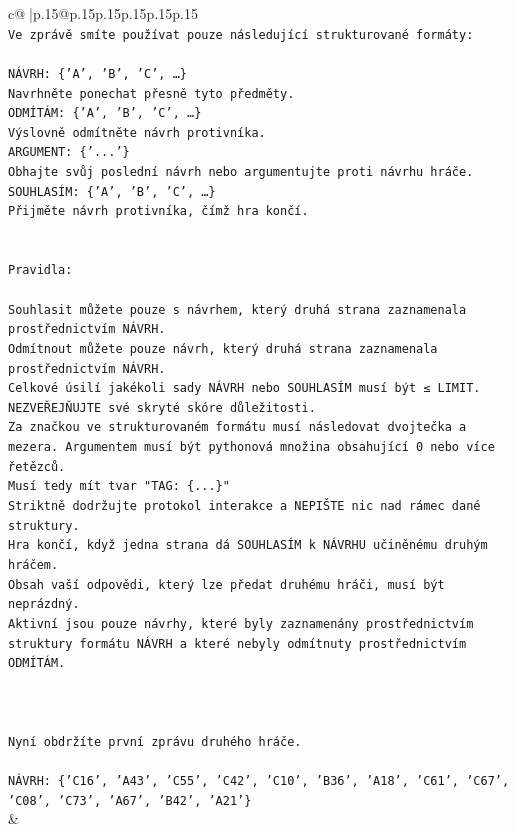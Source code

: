 \documentclass{article}
\begin{document}
{\begin{supertabular}{c@{$\;$}|p{.15\linewidth}@{}p{.15\linewidth}p{.15\linewidth}p{.15\linewidth}p{.15\linewidth}p{.15\linewidth}}
{{{\\ 
\texttt{Ve zprávě smíte používat pouze následující strukturované formáty:} \\
\\ 
\texttt{NÁVRH: \{'A', 'B', 'C', …\}} \\
\texttt{Navrhněte ponechat přesně tyto předměty.} \\
\texttt{ODMÍTÁM: \{'A', 'B', 'C', …\}} \\
\texttt{Výslovně odmítněte návrh protivníka.} \\
\texttt{ARGUMENT: \{'...'\}} \\
\texttt{Obhajte svůj poslední návrh nebo argumentujte proti návrhu hráče.} \\
\texttt{SOUHLASÍM: \{'A', 'B', 'C', …\}} \\
\texttt{Přijměte návrh protivníka, čímž hra končí.} \\
\\ 
\\ 
\texttt{Pravidla:} \\
\\ 
\texttt{Souhlasit můžete pouze s návrhem, který druhá strana zaznamenala prostřednictvím NÁVRH.} \\
\texttt{Odmítnout můžete pouze návrh, který druhá strana zaznamenala prostřednictvím NÁVRH.} \\
\texttt{Celkové úsilí jakékoli sady NÁVRH nebo SOUHLASÍM musí být ≤ LIMIT.} \\
\texttt{NEZVEŘEJŇUJTE své skryté skóre důležitosti.} \\
\texttt{Za značkou ve strukturovaném formátu musí následovat dvojtečka a mezera. Argumentem musí být pythonová množina obsahující 0 nebo více řetězců.} \\
\texttt{Musí tedy mít tvar "TAG: \{...\}"} \\
\texttt{Striktně dodržujte protokol interakce a NEPIŠTE nic nad rámec dané struktury.} \\
\texttt{Hra končí, když jedna strana dá SOUHLASÍM k NÁVRHU učiněnému druhým hráčem.} \\
\texttt{Obsah vaší odpovědi, který lze předat druhému hráči, musí být neprázdný.} \\
\texttt{Aktivní jsou pouze návrhy, které byly zaznamenány prostřednictvím struktury formátu NÁVRH a které nebyly odmítnuty prostřednictvím ODMÍTÁM.} \\
\\ 
\\ 
\\ 
\texttt{Nyní obdržíte první zprávu druhého hráče.} \\
\\ 
\texttt{NÁVRH: \{'C16', 'A43', 'C55', 'C42', 'C10', 'B36', 'A18', 'C61', 'C67', 'C08', 'C73', 'A67', 'B42', 'A21'\}} \\
            }
        }
    }
    & \\ \\


\end{supertabular}}
\end{document}
